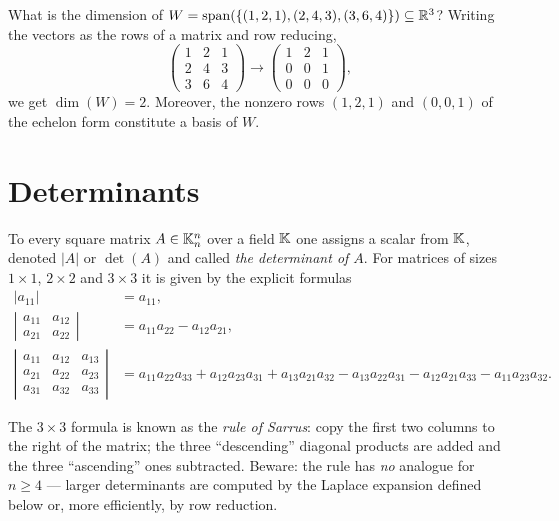 \begin{example}
What is the dimension of $W = \operatorname{span}\!\left(\{(1,2,1),(2,4,3),(3,6,4)\}\right)\subseteq \mathbb{R}^3$? Writing the vectors as the
rows of a matrix and row reducing,
\[
\left( \begin{array}{ccc} 1 & 2 & 1 \\ 2 & 4 & 3 \\ 3 & 6 & 4 \end{array} \right)
\longrightarrow
\left( \begin{array}{ccc} 1 & 2 & 1 \\ 0 & 0 & 1 \\ 0 & 0 & 0 \end{array} \right),
\]
we get $\dim(W) = 2$. Moreover, the nonzero rows $(1,2,1)$ and $(0,0,1)$ of the echelon form constitute a
basis of $W$.
\end{example}

\section{Determinants}

To every square matrix $A \in \mathbb{K}^n_n$ over a field $\mathbb{K}$ one assigns a scalar from $\mathbb{K}$, denoted $|A|$ or
$\det(A)$ and called \emph{the determinant of $A$}. For matrices of sizes $1\times 1$, $2\times 2$ and
$3\times 3$ it is given by the explicit formulas
\[
\begin{aligned}
| a_{11} | &= a_{11},\\[2pt]
\left | \begin{array}{cc} a_{11} & a_{12}\\ a_{21} & a_{22} \end{array} \right | &= a_{11} a_{22} - a_{12} a_{21},\\[2pt]
\left | \begin{array}{ccc}
a_{11} & a_{12} & a_{13}\\ a_{21} & a_{22} & a_{23}\\ a_{31} & a_{32} & a_{33}
\end{array} \right | &=
a_{11} a_{22} a_{33} + a_{12} a_{23} a_{31}+a_{13} a_{21} a_{32}
- a_{13}a_{22}a_{31} -a_{12} a_{21} a_{33} - a_{11} a_{23} a_{32}.
\end{aligned}
\]

\begin{remark}
The $3\times 3$ formula is known as the \emph{rule of Sarrus}: copy the first two columns to the right of
the matrix; the three ``descending'' diagonal products are added and the three ``ascending'' ones
subtracted. Beware: the rule has \emph{no} analogue for $n\geq 4$ — larger determinants are computed by
the Laplace expansion defined below or, more efficiently, by row reduction.
\end{remark}

